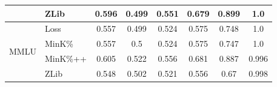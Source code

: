 \begin{table}[h]
\begin{tabular}{clcccccc}
                                     & ZLib                                                        &   0.596       &   0.499      &  0.551       &   0.679       &   0.899       &  1.0           \\ \midrule
\multirow{4}{*}{MMLU}                & Loss                                                        &   0.557       &   0.499      &  0.524       &   0.575       &   0.748       &  1.0           \\  
                                     & MinK\%                                                      &   0.557       &   0.5      &  0.524       &   0.575       &   0.747       &  1.0           \\  
                                     & MinK\%++                                                    &   0.605       &   0.522      &  0.556       &   0.681       &   0.887       &  0.996           \\  
                                     & ZLib                                                        &   0.548       &   0.502      &  0.521       &   0.556       &   0.67       &  0.998           \\ \bottomrule
\end{tabular}
\end{table}